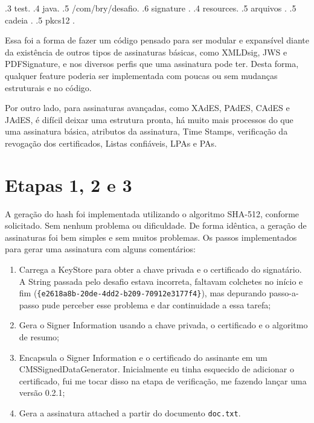 \documentclass{article}
\begin{document}
{        .3 test.
        .4 java.
        .5 /com/bry/desafio.
        .6 signature
        .
        .4 resources.
        .5 arquivos
        .
        .5 cadeia
        .
        .5 pkcs12
        .
    }

    \newpage

    Essa foi a forma de fazer um código pensado para ser modular e expansível diante da existência de outros tipos de assinaturas básicas, como XMLDsig, JWS e PDFSignature, e nos diversos perfis que uma assinatura pode ter. Desta forma, qualquer feature poderia ser implementada com poucas ou sem mudanças estruturais e no código.

    Por outro lado, para assinaturas avançadas, como XAdES, PAdES, CAdES e JAdES, é difícil deixar uma estrutura pronta, há muito mais processos do que uma assinatura básica, atributos da assinatura, Time Stamps, verificação da revogação dos certificados, Listas confiáveis, LPAs e PAs.

    \section{Etapas 1, 2 e 3}

    A geração do hash foi implementada utilizando o algoritmo SHA-512, conforme solicitado. Sem nenhum problema ou dificuldade. De forma idêntica, a geração de assinaturas foi bem simples e sem muitos problemas. Os passos implementados para gerar uma assinatura com alguns comentários:

    \begin{enumerate}
        \item Carrega a KeyStore para obter a chave privada e o certificado do signatário. A String passada pelo desafio estava incorreta, faltavam colchetes no início e fim (\texttt{\{e2618a8b-20de-4dd2-b209-70912e3177f4\}}), mas depurando passo-a-passo pude perceber esse problema e dar continuidade a essa tarefa;
        \item Gera o Signer Information usando a chave privada, o certificado e o algoritmo de resumo;
        \item Encapsula o Signer Information e o certificado do assinante em um CMSSignedDataGenerator. Inicialmente eu tinha esquecido de adicionar o certificado, fui me tocar disso na etapa de verificação, me fazendo lançar uma versão 0.2.1;
        \item Gera a assinatura attached a partir do documento \texttt{doc.txt}.
    \end{enumerate}
\end{document}
